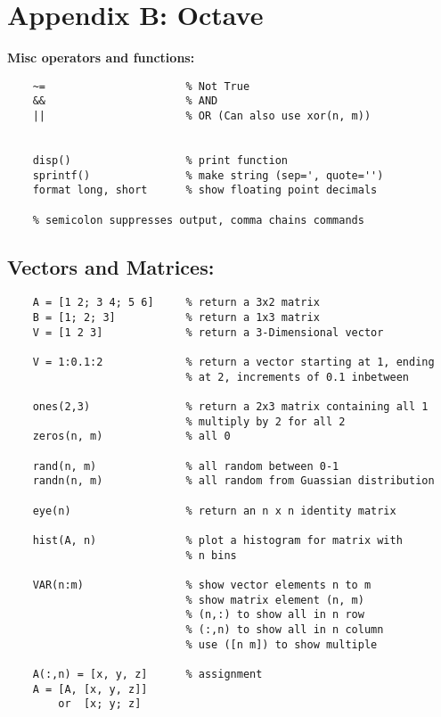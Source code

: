 \documentclass[12pt] {article}
\begin{document}
{  
  \newpage

\section{Appendix B: Octave}

  \textbf{Misc operators and functions:}
  \begin{lstlisting}
    ~=                      % Not True
    &&                      % AND
    ||                      % OR (Can also use xor(n, m))
 

    disp()                  % print function
    sprintf()               % make string (sep=', quote='')
    format long, short      % show floating point decimals

    % semicolon suppresses output, comma chains commands

  \end{lstlisting}

  \subsection{Vectors and Matrices:}

    \begin{lstlisting}
    A = [1 2; 3 4; 5 6]     % return a 3x2 matrix
    B = [1; 2; 3]           % return a 1x3 matrix
    V = [1 2 3]             % return a 3-Dimensional vector

    V = 1:0.1:2             % return a vector starting at 1, ending
                            % at 2, increments of 0.1 inbetween

    ones(2,3)               % return a 2x3 matrix containing all 1
                            % multiply by 2 for all 2
    zeros(n, m)             % all 0

    rand(n, m)              % all random between 0-1
    randn(n, m)             % all random from Guassian distribution

    eye(n)                  % return an n x n identity matrix

    hist(A, n)              % plot a histogram for matrix with 
                            % n bins   
 
    VAR(n:m)                % show vector elements n to m
                            % show matrix element (n, m)
                            % (n,:) to show all in n row
                            % (:,n) to show all in n column
                            % use ([n m]) to show multiple
  
    A(:,n) = [x, y, z]      % assignment
    A = [A, [x, y, z]]
        or  [x; y; z]


\end{lstlisting}}
\end{document}
